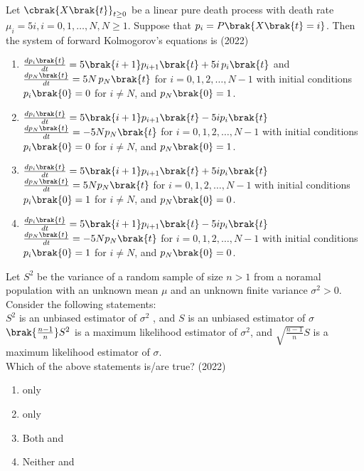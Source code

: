     \item Let $\cbrak{X\brak{t}}_{t\geq 0}$ be a linear pure death process  with death rate $\mu_i =5i, i=0,1,\ldots ,N, N\geq 1$. Suppose that $p_i = P\brak{X\brak{t}=i}$. Then the system of forward Kolmogorov's equations is 
    \hfill{(2022)}
    \begin{enumerate}
        \item $\frac{dp_i\brak{t}}{dt} = 5\brak{i+1}p_{i+1}\brak{t} + 5i \, p_i\brak{t}$ 
and $\frac{dp_N\brak{t}}{dt} = 5N \, p_N\brak{t}$ for $i = 0, 1, 2, \ldots, N-1$ 
with initial conditions $p_i\brak{0} = 0$ for $i \neq N$, and $p_N\brak{0} = 1$.

        \item $\frac{dp_i\brak{t}}{dt} = 5\brak{i+1}p_{i+1}\brak{t} - 5i p_i\brak{t}$ 
$\frac{dp_N\brak{t}}{dt} = -5N p_N\brak{t}$ 
for $i = 0, 1, 2, \ldots, N-1$ with initial conditions $p_i\brak{0} = 0$ for $i \neq N$, and $p_N\brak{0} = 1$.

\item $\frac{dp_i\brak{t}}{dt} = 5\brak{i+1}p_{i+1}\brak{t} + 5i p_i\brak{t}$ 
$\frac{dp_N\brak{t}}{dt} = 5N p_N\brak{t}$ 
for $i = 0, 1, 2, \ldots, N-1$ with initial conditions $p_i\brak{0} = 1$ for $i \neq N$, and $p_N\brak{0} = 0$.

\item $\frac{dp_i\brak{t}}{dt} = 5\brak{i+1}p_{i+1}\brak{t} - 5i p_i\brak{t}$ 
$\frac{dp_N\brak{t}}{dt} = -5N p_N\brak{t}$ 
for $i = 0, 1, 2, \ldots, N-1$ with initial conditions $p_i\brak{0} = 1$ for $i \neq N$, and $p_N\brak{0} = 0$.

    \end{enumerate}
    \item Let $S^2$ be the variance of a random sample of size $n>1$ from a noramal population with an unknown mean $\mu$ and an unknown finite variance $\sigma ^2>0$. Consider the following statements:\\
     $S^2$ is an unbiased estimator of $\sigma ^2$ , and $S$ is an unbiased  estimator of $\sigma$\\
     $\brak{\frac{n-1}{n}}S^2$ is a maximum likelihood estimator of $\sigma ^2$, and $\sqrt{\frac{n-1}{n}}S$ is a maximum likelihood estimator of $\sigma$.\\
    Which of the above statements is/are true?
    \hfill{(2022)}
    \begin{enumerate}
        \item {} only 
        \item {} only 
        \item Both  and 
        \item Neither  and 
    \end{enumerate}
    


